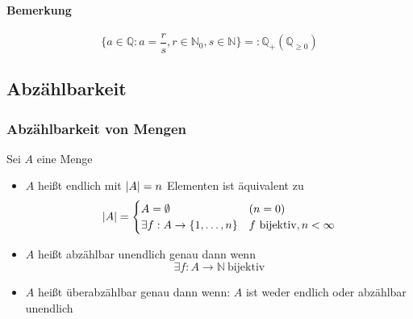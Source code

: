 \documentclass[a4paper]{scrartcl}
\DeclarePairedDelimiter\abs{\lvert}{\rvert}%
\begin{document}
\paragraph{Bemerkung}
\label{sec-2-4-3-2}
\[\{a\in\mathbb{Q}: a = \frac{r}{s},r\in\mathbb{N}_0,s\in\mathbb{N}\} =: \mathbb{Q}_+ (\mathbb{Q}_{\geq 0})\]
\subsection{Abzählbarkeit}
\label{sec-2-5}
\subsubsection{Abzählbarkeit von Mengen}
\label{sec-2-5-1}
Sei $A$ eine Menge\\
\begin{itemize}
\item $A$ heißt endlich mit $\abs{A} = n$ Elementen ist äquivalent zu
\[\abs{A} = \begin{cases} A = \emptyset &(n = 0) \\ \exists f:A\to \{1,\ldots,n\} &f~\text{bijektiv},n < \infty\end{cases}\]
\item $A$ heißt abzählbar unendlich genau dann wenn \[\exists f: A\to \mathbb{N}~\text{bijektiv}\]
\item $A$ heißt überabzählbar genau dann wenn: $A$ ist weder endlich oder abzählbar unendlich
\end{itemize}
\end{document}
